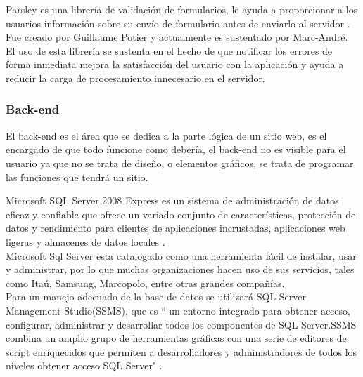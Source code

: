 
 Parsley es una librería de validación de formularios, le ayuda a proporcionar a los usuarios información sobre su envío de formulario antes de enviarlo al servidor \cite{PAR15}. Fue creado por Guillaume Potier y actualmente es sustentado por Marc-André. 
\\

El uso de esta librería se sustenta en el hecho de que notificar los errores de forma inmediata  mejora la satisfacción del usuario con la aplicación y ayuda a reducir la carga de procesamiento innecesario en el servidor.

\subsubsection{Back-end}

El back-end es el área que se dedica a la parte lógica de un sitio web, es el encargado de que todo funcione como debería, el back-end no es visible para el usuario ya que no se trata de diseño, o elementos gráficos, se trata de programar las funciones que tendrá un sitio.


Microsoft SQL Server 2008 Express es un sistema de administración de datos eficaz y confiable que ofrece un variado conjunto de características, protección de datos y rendimiento para clientes de aplicaciones incrustadas, aplicaciones web ligeras y almacenes de datos locales \cite{mic15}.
\\



Microsoft Sql Server  esta catalogado como  una herramienta fácil de instalar, usar y administrar, por lo que muchas organizaciones hacen uso de sus servicios, tales como  Itaú, Samsung, Marcopolo, entre otras grandes compañías.
\\


Para un manejo adecuado de la base de datos se utilizará SQL Server Management Studio(SSMS), que es `` un entorno integrado para obtener acceso, configurar, administrar y desarrollar todos los componentes de SQL Server.SSMS combina un amplio grupo de herramientas gráficas con una serie de editores de script enriquecidos que permiten a desarrolladores y administradores de todos los niveles obtener acceso SQL Server" \cite{mic15}.








